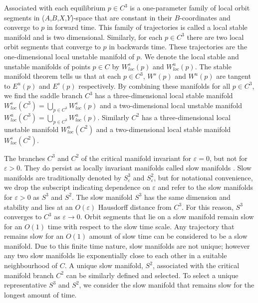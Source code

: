 \documentclass{ws-ijbc}
\begin{document}
Associated with each equilibrium $p \in C^3$ is a one-parameter family of local orbit segments in ($A$,$B$,$X$,$Y$)-space that are constant in their $B$-coordinates and converge to $p$ in forward time.  This family of trajectories is called a local stable manifold and is two dimensional.  Similarly, for each $p \in C^3$ there are two local orbit segments that converge to $p$ in backwards time.  These trajectories are the one-dimensional local unstable manifold of $p$.  We denote the local stable and unstable manifolds of points $p \in C$ by $W^{s}_{loc}(p)$ and $W^{u}_{loc}(p)$.  The stable manifold theorem tells us that at each $p \in C^3$, $W^{s}(p)$ and $W^{u}(p)$ are tangent to $E^{u}(p)$ and $E^{s}(p)$ respectively.  By combining these manifolds for all $p \in C^3$, we find the saddle branch $C^3$ has a three-dimensional local stable manifold $W^{s}_{loc}(C^3) = \bigcup_{p \in C^3} W^{s}_{loc}(p)$ and a two-dimensional local unstable manifold $W^{u}_{loc}(C^3) = \bigcup_{p \in C^3} W^{u}_{loc}(p)$.  Similarly $C^2$ has a three-dimensional local unstable manifold $W^{u}_{loc}(C^2)$ and a two-dimensional local stable manifold $W^{s}_{loc}(C^2)$.

The branches $C^3$ and $C^2$ of the critical manifold invariant for $\varepsilon = 0$, but not for $\varepsilon > 0$.  They do persist as locally invariant manifolds called slow manifolds \cite{Fenichel}.  Slow manifolds are traditionally denoted by $S^3_\varepsilon$ and $S^2_\varepsilon$, but for notational convenience, we drop the subscript indicating dependence on $\varepsilon$ and refer to the slow manifolds for $\varepsilon > 0$ as $S^3$ and $S^2$.  The slow manifold $S^3$ has the same dimension and stability and lies at an $O(\varepsilon)$ Hausdorff distance from $C^3$.  For this reason, $S^3$ converges to $C^3$ as $\varepsilon \rightarrow 0$.  Orbit segments that lie on a slow manifold remain slow for an $O(1)$ time with respect to the slow time scale.  Any trajectory that remains slow for an $O(1)$ amount of slow time can be considered to be a slow manifold.  Due to this finite time nature, slow manifolds are not unique; however any two slow manifolds lie exponentially close to each other in a suitable neighbourhood of $C$.  A unique slow manifold, $S^2$, associated with the critical manifold branch $C^2$ can be similarly defined and selected.  To select a unique representative $S^3$ and $S^2$, we consider the slow manifold that remains slow for the longest amount of time.
\end{document}
